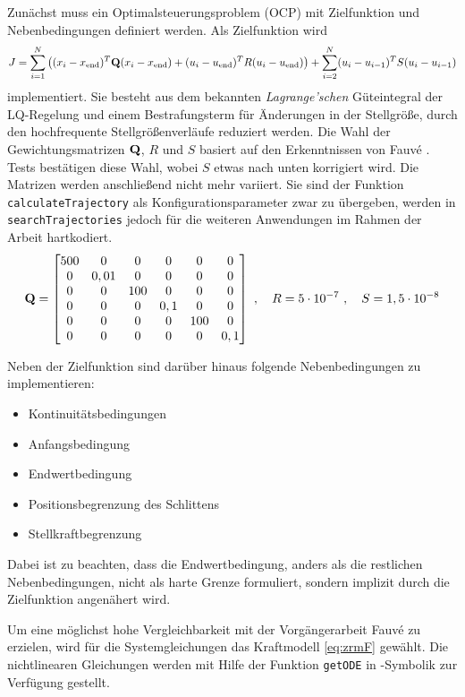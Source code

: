Zunächst muss ein Optimalsteuerungsproblem (OCP) mit Zielfunktion und Nebenbedingungen definiert werden. Als Zielfunktion wird 
	\[
	J = \sum_{i=1}^N \left((x_i-x_{\mathrm{end}})^T {\boldsymbol{\mathrm{Q}}} (x_i-x_{\mathrm{end}}) + (u_i-u_{\mathrm{end}})^T R (u_i-u_{\mathrm{end}})\right) + 
	\sum_{i=2}^N (u_i-u_{i-1})^T S (u_i-u_{i-1})
\]
implementiert. Sie besteht aus dem bekannten \emph{Lagrange'schen} Güteintegral der LQ-Regelung und einem Bestrafungsterm für Änderungen in der Stellgröße, durch den hochfrequente Stellgrößenverläufe reduziert werden. Die Wahl der Gewichtungsmatrizen ${\boldsymbol{\mathrm{Q}}}$, $R$ und $S$ basiert auf den Erkenntnissen von Fauvé \cite{fauve}. Tests bestätigen diese Wahl, wobei $S$ etwas nach unten korrigiert wird. Die Matrizen werden anschließend nicht mehr variiert. Sie sind der Funktion \texttt{calculateTrajectory} als Konfigurationsparameter zwar zu übergeben, werden in \texttt{searchTrajectories} jedoch für die weiteren Anwendungen im Rahmen der Arbeit hartkodiert.
\[ 
	{\boldsymbol{\mathrm{Q}}} = 
	\begin{bmatrix}
		500 & 0 & 0 & 0 & 0 & 0 \\
		0 & 0,01 & 0 & 0 & 0 & 0 \\
		0 & 0 & 100 & 0 & 0 & 0 \\
		0 & 0 & 0 & 0,1 & 0 & 0 \\
		0 & 0 & 0 & 0 & 100 & 0 \\
		0 & 0 & 0 & 0 & 0 & 0,1 \\
	\end{bmatrix} \ , \quad
	R = 5 \cdot 10^{-7} \ , \quad
	S = 1,5 \cdot 10^{-8} \\	
\]


Neben der Zielfunktion sind darüber hinaus folgende Nebenbedingungen zu implementieren:
\begin{itemize}
	\item Kontinuitätsbedingungen 
	\item Anfangsbedingung
	\item Endwertbedingung
	\item Positionsbegrenzung des Schlittens
	\item Stellkraftbegrenzung
\end{itemize}

Dabei ist zu beachten, dass die Endwertbedingung, anders als die restlichen Nebenbedingungen, nicht als harte Grenze formuliert, sondern implizit durch die Zielfunktion angenähert wird. 

Um eine möglichst hohe Vergleichbarkeit mit der Vorgängerarbeit Fauvé \cite{fauve} zu erzielen, wird für die Systemgleichungen das Kraftmodell  \eqref{eq:zrmF} gewählt. Die nichtlinearen Gleichungen werden mit Hilfe der Funktion \texttt{getODE} in \casadi-Symbolik zur Verfügung gestellt.

